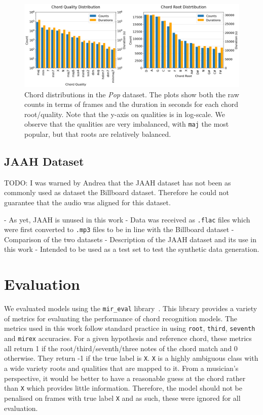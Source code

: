 \begin{figure}[H]
    \centering
    \includegraphics[width=1.0\textwidth]{figures/chord_distribution.png}
    \caption{Chord distributions in the \emph{Pop} dataset. The plots show both the raw counts in terms of frames and the duration in seconds for each chord root/quality. Note that the y-axis on qualities is in log-scale. We observe that the qualities are very imbalanced, with \texttt{maj} the most popular, but that roots are relatively balanced.}\label{fig:chord-distribution}
\end{figure}


\subsection{JAAH Dataset}

TODO: I was warned by Andrea that the JAAH dataset has not been as commonly used as dataset the Billboard dataset. Therefore he could not guarantee that the audio was aligned for this dataset.

- As yet, JAAH is unused in this work
- Data was received as \texttt{.flac} files which were first converted to \texttt{.mp3} files to be in line with the Billboard dataset
- Comparison of the two datasets
- Description of the JAAH dataset and its use in this work
- Intended to be used as a test set to test the synthetic data generation.

\section{Evaluation}\label{sec:evaluation}

We evaluated models using the \texttt{mir\_eval} library~\citep{mir_eval}. This library provides a variety of metrics for evaluating the performance of chord recognition models. The metrics used in this work follow standard practice in using \texttt{root}, \texttt{third}, \texttt{seventh} and \texttt{mirex} accuracies. For a given hypothesis and reference chord, these metrics all return 1 if the root/third/seventh/three notes of the chord match and 0 otherwise. They return -1 if the true label is \texttt{X}. \texttt{X} is a highly ambiguous class with a wide variety roots and qualities that are mapped to it. From a musician's perspective, it would be better to have a reasonable guess at the chord rather than \texttt{X} which provides little information. Therefore, the model should not be penalised on frames with true label \texttt{X} and as such, these were ignored for all evaluation.

